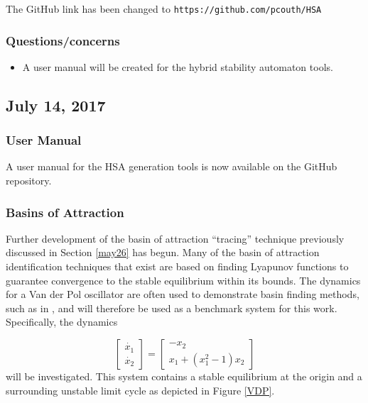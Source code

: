 \documentclass[12pt]{article}
\begin{document}
\noindent The GitHub link has been changed to \texttt{https://github.com/pcouth/HSA}

\subsubsection{Questions/concerns}
\begin{itemize}
\item A user manual will be created for the hybrid stability automaton tools.
\end{itemize}


\subsection{July 14, 2017}

\subsubsection{User Manual}
A user manual for the HSA generation tools is now available on the GitHub repository.

\subsubsection{Basins of Attraction}
Further development of the basin of attraction ``tracing'' technique previously discussed in Section \ref{may26} has begun. Many of the basin of attraction identification techniques that exist are based on finding Lyapunov functions to guarantee convergence to the stable equilibrium within its bounds. The dynamics for a Van der Pol oscillator are often used to demonstrate basin finding methods, such as in \cite{tan}, and will therefore be used as a benchmark system for this work. Specifically, the dynamics

\begin{equation}
\begin{bmatrix}
\dot{x_1}\\\dot{x_2}
\end{bmatrix}
=
\begin{bmatrix}
-x_2\\x_1+\left(x_1^2-1\right)x_2
\end{bmatrix}
\end{equation}
will be investigated. This system contains a stable equilibrium at the origin and a surrounding unstable limit cycle as depicted in Figure \ref{VDP}.
\end{document}
